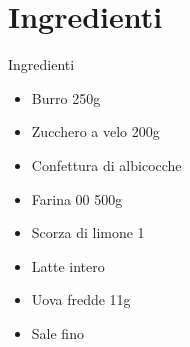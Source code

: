 \section{Ingredienti}
\begin{frame}{Ingredienti}
  \begin{itemize}
    \item Burro 250g
    \item Zucchero a velo 200g
    \item Confettura di albicocche
    \item Farina 00 500g
    \item Scorza di limone 1
    \item Latte intero 
    \item Uova fredde 11g
    \item Sale fino
  \end{itemize}
\end{frame}
